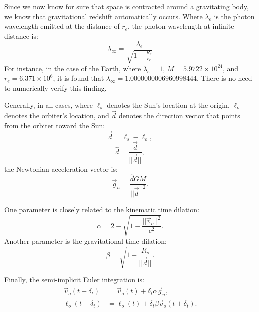 \documentclass[12pt]{article}
\begin{document}
Since we now know for sure that space is contracted around a gravitating body, we know that gravitational redshift automatically occurs.
Where $\lambda_{e}$ is the photon wavelength emitted at the distance of $r_e$, the photon wavelength at infinite distance is:
\begin{equation}
\label{wl_inf}
\lambda_{\infty} = \frac{\lambda_{e}}{\sqrt{1 - \frac{R_s}{r_e}}}
\end{equation}
For instance, in the case of the Earth, where $\lambda_{e} = 1$, $M = 5.9722 \times 10^{24}$, and $r_e = 6.371 \times 10^6$, it is found that $\lambda_{\infty} = 1.0000000006960998444$.
There is no need to numerically verify this finding.







Generally, in all cases, where $\ell_s$ denotes the Sun's location at the origin, $\ell_o$ denotes the orbiter's location, and $\vec{d}$ denotes the direction vector that points from the orbiter toward the Sun:
\begin{equation}
\label{direction_vector}
\vec{d} = \ell_{s} - \ell_{o},	
\end{equation}
\begin{equation}
\label{direction_unit_vector}
\hat{d} = \frac{\vec{d}}{\lvert\lvert \vec{d} \rvert\rvert},
\end{equation}
the Newtonian acceleration vector is:
\begin{equation}
\label{newton}
\vec{g}_n = \frac{\hat{d} G M}{{\lvert\lvert \vec{d} \rvert\rvert}^2}.
\end{equation}

One parameter is closely related to the kinematic time dilation:
\begin{equation}
\label{eq_kinematic}
\alpha = 2 - \sqrt{1 - \frac{\lvert\lvert \vec{v}_{o}\rvert\rvert^2}{c^2}}.
\end{equation}
Another parameter is the gravitational time dilation:
\begin{equation}
\label{eq_gravitational}
\beta = \sqrt{1 - \frac{R_{s}}{\lvert \lvert \vec{d} \rvert \rvert}}.
\end{equation}

Finally, the semi-implicit Euler integration is:
\begin{align}
\label{eq_velocity}
\vec{v}_{o}(t + \delta_t) &= \vec{v}_{o}(t) + \delta_{t} \alpha \vec{g}_n, \\
\label{eq_position}
\ell_{o}(t + \delta_t) &= \ell_{o}(t) + \delta_{t} \beta \vec{v}_{o}(t + \delta_t).
\end{align}
\end{document}
